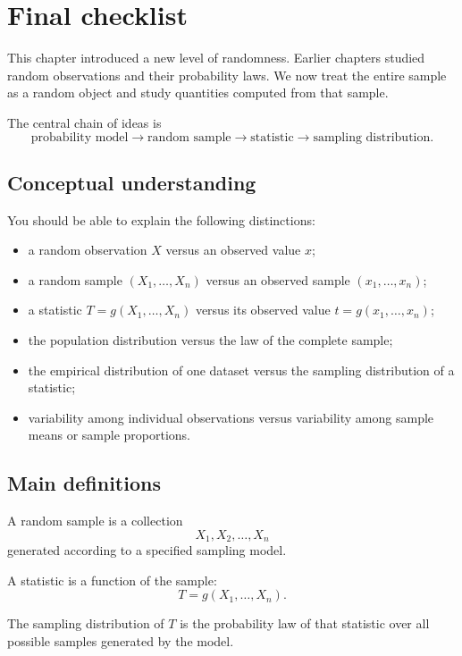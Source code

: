 \section{Final checklist}

This chapter introduced a new level of randomness. Earlier chapters studied
random observations and their probability laws. We now treat the entire sample
as a random object and study quantities computed from that sample.

The central chain of ideas is
\[
\text{probability model}
\longrightarrow
\text{random sample}
\longrightarrow
\text{statistic}
\longrightarrow
\text{sampling distribution}.
\]

\subsection*{Conceptual understanding}

You should be able to explain the following distinctions:

\begin{itemize}
    \item a random observation \(X\) versus an observed value \(x\);
    \item a random sample \((X_1,\ldots,X_n)\) versus an observed sample
    \((x_1,\ldots,x_n)\);
    \item a statistic \(T=g(X_1,\ldots,X_n)\) versus its observed value
    \(t=g(x_1,\ldots,x_n)\);
    \item the population distribution versus the law of the complete sample;
    \item the empirical distribution of one dataset versus the sampling
    distribution of a statistic;
    \item variability among individual observations versus variability among
    sample means or sample proportions.
\end{itemize}

\subsection*{Main definitions}

A random sample is a collection
\[
X_1,X_2,\ldots,X_n
\]
generated according to a specified sampling model.

A statistic is a function of the sample:
\[
T=g(X_1,\ldots,X_n).
\]

The sampling distribution of \(T\) is the probability law of that statistic over
all possible samples generated by the model.

